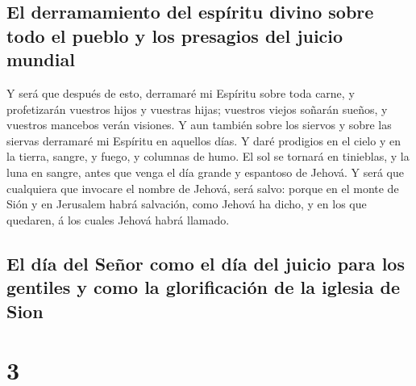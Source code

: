 \hypertarget{el-derramamiento-del-espuxedritu-divino-sobre-todo-el-pueblo-y-los-presagios-del-juicio-mundial}{%
\subsection{El derramamiento del espíritu divino sobre todo el pueblo y
los presagios del juicio
mundial}\label{el-derramamiento-del-espuxedritu-divino-sobre-todo-el-pueblo-y-los-presagios-del-juicio-mundial}}

 Y será que después de esto, derramaré mi Espíritu sobre
toda carne, y profetizarán vuestros hijos y vuestras hijas; vuestros
viejos soñarán sueños, y vuestros mancebos verán visiones.
 Y aun también sobre los siervos y sobre las siervas
derramaré mi Espíritu en aquellos días.  Y daré prodigios
en el cielo y en la tierra, sangre, y fuego, y columnas de humo.
 El sol se tornará en tinieblas, y la luna en sangre,
antes que venga el día grande y espantoso de Jehová.  Y
será que cualquiera que invocare el nombre de Jehová, será salvo: porque
en el monte de Sión y en Jerusalem habrá salvación, como Jehová ha
dicho, y en los que quedaren, á los cuales Jehová habrá llamado.

\hypertarget{el-duxeda-del-seuxf1or-como-el-duxeda-del-juicio-para-los-gentiles-y-como-la-glorificaciuxf3n-de-la-iglesia-de-sion}{%
\subsection{El día del Señor como el día del juicio para los gentiles y
como la glorificación de la iglesia de
Sion}\label{el-duxeda-del-seuxf1or-como-el-duxeda-del-juicio-para-los-gentiles-y-como-la-glorificaciuxf3n-de-la-iglesia-de-sion}}

\hypertarget{section-2}{%
\section{3}\label{section-2}}

